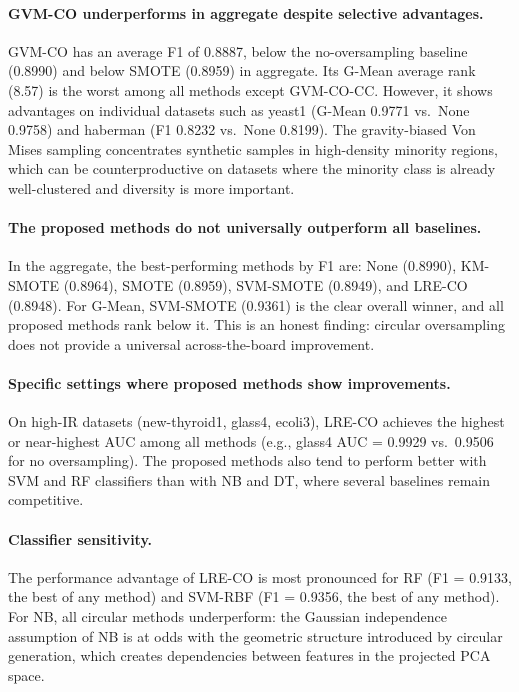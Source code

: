 \paragraph{GVM-CO underperforms in aggregate despite selective advantages.}
GVM-CO has an average F1 of 0.8887, below the no-oversampling baseline (0.8990) and below SMOTE (0.8959) in aggregate.
Its G-Mean average rank (8.57) is the worst among all methods except GVM-CO-CC.
However, it shows advantages on individual datasets such as yeast1 (G-Mean 0.9771 vs.\ None 0.9758) and haberman (F1 0.8232 vs.\ None 0.8199).
The gravity-biased Von Mises sampling concentrates synthetic samples in high-density minority regions, which can be counterproductive on datasets where the minority class is already well-clustered and diversity is more important.

\paragraph{The proposed methods do not universally outperform all baselines.}
In the aggregate, the best-performing methods by F1 are: None (0.8990), KM-SMOTE (0.8964), SMOTE (0.8959), SVM-SMOTE (0.8949), and LRE-CO (0.8948).
For G-Mean, SVM-SMOTE (0.9361) is the clear overall winner, and all proposed methods rank below it.
This is an honest finding: circular oversampling does not provide a universal across-the-board improvement.

\paragraph{Specific settings where proposed methods show improvements.}
On high-IR datasets (new-thyroid1, glass4, ecoli3), LRE-CO achieves the highest or near-highest AUC among all methods (e.g., glass4 AUC = 0.9929 vs.\ 0.9506 for no oversampling).
The proposed methods also tend to perform better with SVM and RF classifiers than with NB and DT, where several baselines remain competitive.

\paragraph{Classifier sensitivity.}
The performance advantage of LRE-CO is most pronounced for RF (F1 = 0.9133, the best of any method) and SVM-RBF (F1 = 0.9356, the best of any method).
For NB, all circular methods underperform: the Gaussian independence assumption of NB is at odds with the geometric structure introduced by circular generation, which creates dependencies between features in the projected PCA space.

